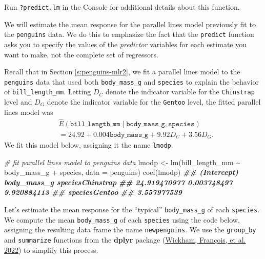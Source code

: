 \documentclass[
]{book}
\newenvironment{Shaded}{\begin{snugshade}}{\end{snugshade}}
\newcommand{\AttributeTok}[1]{\textcolor[rgb]{0.77,0.63,0.00}{#1}}
\newcommand{\CommentTok}[1]{\textcolor[rgb]{0.56,0.35,0.01}{\textit{#1}}}
\newcommand{\DocumentationTok}[1]{\textcolor[rgb]{0.56,0.35,0.01}{\textbf{\textit{#1}}}}
\newcommand{\FunctionTok}[1]{\textcolor[rgb]{0.00,0.00,0.00}{#1}}
\newcommand{\NormalTok}[1]{#1}
\newcommand{\OtherTok}[1]{\textcolor[rgb]{0.56,0.35,0.01}{#1}}
\newcommand{\SpecialCharTok}[1]{\textcolor[rgb]{0.00,0.00,0.00}{#1}}
\theoremstyle{definition}
\theoremstyle{definition}
\theoremstyle{definition}
\theoremstyle{definition}
\theoremstyle{remark}
\begin{document}
Run \texttt{?predict.lm} in the Console for additional details about this
function.

We will estimate the mean response for the parallel lines model
previously fit to the \texttt{penguins} data. We do this to emphasize the fact
that the \texttt{predict} function asks you to specify the values of the
\emph{predictor} variables for each estimate you want to make, not the
complete set of regressors.

Recall that in Section \ref{s:penguins-mlr2}, we fit a parallel lines
model to the \texttt{penguins} data that used both \texttt{body\_mass\_g} and \texttt{species}
to explain the behavior of \texttt{bill\_length\_mm}. Letting \(D_C\) denote the
indicator variable for the \texttt{Chinstrap} level and \(D_G\) denote the
indicator variable for the \texttt{Gentoo} level, the fitted parallel lines
model was \[
\begin{aligned}
&\hat{E}(\mathtt{bill\_length\_mm} \mid \mathtt{body\_mass\_g}, \mathtt{species})\\
&= 24.92 + 0.004 \mathtt{body\_mass\_g} + 9.92 D_C + 3.56 D_G.
\end{aligned}
\] We fit this model below, assigning it the name \texttt{lmodp}.

\begin{Shaded}
\begin{Highlighting}[]
\CommentTok{\# fit parallel lines model to penguins data}
\NormalTok{lmodp }\OtherTok{\textless{}{-}} \FunctionTok{lm}\NormalTok{(bill\_length\_mm }\SpecialCharTok{\textasciitilde{}}\NormalTok{ body\_mass\_g }\SpecialCharTok{+}\NormalTok{ species,}
            \AttributeTok{data =}\NormalTok{ penguins)}
\FunctionTok{coef}\NormalTok{(lmodp)}
\DocumentationTok{\#\#      (Intercept)      body\_mass\_g speciesChinstrap }
\DocumentationTok{\#\#     24.919470977      0.003748497      9.920884113 }
\DocumentationTok{\#\#    speciesGentoo }
\DocumentationTok{\#\#      3.557977539}
\end{Highlighting}
\end{Shaded}

Let's estimate the mean response for the ``typical'' \texttt{body\_mass\_g} of each \texttt{species}. We compute the mean \texttt{body\_mass\_g} of each \texttt{species} using the code below, assigning the resulting data frame the name \texttt{newpenguins}. We use the \texttt{group\_by} and \texttt{summarize} functions from the \textbf{dplyr} package (\protect\hyperlink{ref-R-dplyr}{Wickham, François, et al. 2022}) to simplify this process.
\end{document}
